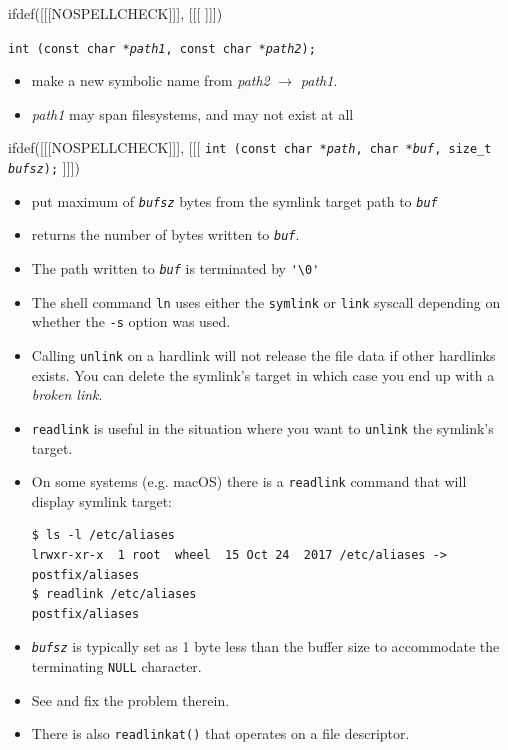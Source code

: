 
ifdef([[[NOSPELLCHECK]]], [[[
]]])

\begin{slide}
\texttt{int (const char *\emph{path1},
const char *\emph{path2});}
\begin{itemize}
\item make a new symbolic name from \emph{path2} $\rightarrow$ \emph{path1}.
\item \emph{path1} may span filesystems, and may not exist at all
\end{itemize}
ifdef([[[NOSPELLCHECK]]], [[[
\texttt{int (const char *\emph{path}, char *\emph{buf},
size\_t \emph{bufsz});}
]]])
\begin{itemize}
\item put maximum of \emph{\texttt{bufsz}} bytes from the symlink target path
to \texttt{\emph{buf}}
\item returns the number of bytes written to \texttt{\emph{buf}}.
\item The path written to \texttt{\emph{buf}} is  terminated
by \verb#'\0'#
\end{itemize}
\end{slide}

\begin{itemize}
\item The shell command \texttt{ln} uses either the \texttt{symlink} or
\texttt{link} syscall depending on whether the \texttt{-s} option was used.
\item Calling \texttt{unlink} on a hardlink will not release the file data if
other hardlinks exists. You can delete the symlink's target in which case you
end up with a \emph{broken link}.
\item \texttt{readlink} is useful in the situation where you want to
\texttt{unlink} the symlink's target.
\item On some systems (e.g. macOS) there is a \texttt{readlink} command that
will display symlink target:
\begin{verbatim}
$ ls -l /etc/aliases
lrwxr-xr-x  1 root  wheel  15 Oct 24  2017 /etc/aliases -> postfix/aliases
$ readlink /etc/aliases
postfix/aliases
\end{verbatim}
\item \emph{\texttt{bufsz}} is typically set as 1 byte less than the buffer
size to accommodate the terminating \texttt{NULL} character.
\item See  and fix the problem therein.
\item There is also \texttt{readlinkat()} that operates on a file descriptor.
\end{itemize}

